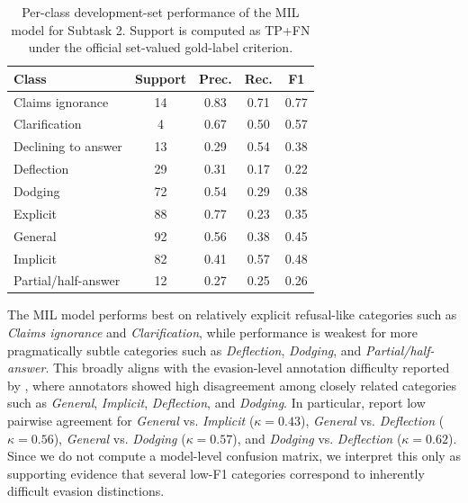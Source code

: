 \documentclass[11pt]{article}
\begin{document}
\begin{table}[h]
\centering
\scriptsize
\begin{tabular}{lcccc}
\hline
\textbf{Class} & \textbf{Support} & \textbf{Prec.} & \textbf{Rec.} & \textbf{F1} \\
\hline
Claims ignorance & 14 & 0.83 & 0.71 & 0.77 \\
Clarification & 4 & 0.67 & 0.50 & 0.57 \\
Declining to answer & 13 & 0.29 & 0.54 & 0.38 \\
Deflection & 29 & 0.31 & 0.17 & 0.22 \\
Dodging & 72 & 0.54 & 0.29 & 0.38 \\
Explicit & 88 & 0.77 & 0.23 & 0.35 \\
General & 92 & 0.56 & 0.38 & 0.45 \\
Implicit & 82 & 0.41 & 0.57 & 0.48 \\
Partial/half-answer & 12 & 0.27 & 0.25 & 0.26 \\
\hline
\end{tabular}
\caption{Per-class development-set performance of the MIL model for Subtask 2. Support is computed as TP+FN under the official set-valued gold-label criterion.}
\label{tab:subtask2_per_class}
\end{table}

The MIL model performs best on relatively explicit refusal-like categories such as \textit{Claims ignorance} and \textit{Clarification}, while performance is weakest for more pragmatically subtle categories such as \textit{Deflection}, \textit{Dodging}, and \textit{Partial/half-answer}. This broadly aligns with the evasion-level annotation difficulty reported by \citet{b4}, where annotators showed high disagreement among closely related categories such as \textit{General}, \textit{Implicit}, \textit{Deflection}, and \textit{Dodging}. In particular, \citet{b4} report low pairwise agreement for \textit{General} vs. \textit{Implicit} ($\kappa=0.43$), \textit{General} vs. \textit{Deflection} ($\kappa=0.56$), \textit{General} vs. \textit{Dodging} ($\kappa=0.57$), and \textit{Dodging} vs. \textit{Deflection} ($\kappa=0.62$). Since we do not compute a model-level confusion matrix, we interpret this only as supporting evidence that several low-F1 categories correspond to inherently difficult evasion distinctions.
\end{document}
